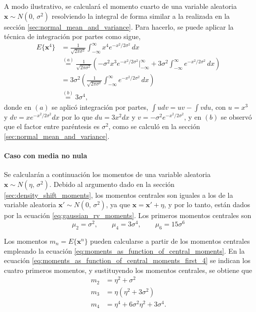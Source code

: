 \documentclass[a4paper]{report}
\newcommand{\x}{\mathbf{x}}
\begin{document}
A modo ilustrativo, se calculará el momento cuarto de una variable aleatoria \(\x\sim N(0,\,\sigma^2)\) resolviendo la integral de forma similar a la realizada en la sección \ref{sec:normal_mean_and_variance}. Para hacerlo, se puede aplicar la técnica de integración por partes como sigue,
\begin{align*}
 E\{\x^4\}&=\frac{1}{\sqrt{2\pi\sigma^2}}\int_{-\infty}^{\infty} x^4e^{-x^2/2\sigma^2}\,dx\\
 &\overset{(a)}{=}\frac{1}{\sqrt{2\pi\sigma^2}}\left(-\sigma^2x^3e^{-x^2/2\sigma^2}\bigg|_{-\infty}^{\infty} +3\sigma^2\int_{-\infty}^{\infty}e^{-x^2/2\sigma^2}\,dx\right)\\
 &=3\sigma^2\left(\frac{1}{\sqrt{2\pi\sigma^2}}\int_{-\infty}^{\infty}e^{-x^2/2\sigma^2}\,dx\right)\\
 &\overset{(b)}{=}3\sigma^4,
\end{align*}
donde en \((a)\) se aplicó integración por partes, \(\int udv=uv-\int vdu\), con \(u=x^3\) y \(dv=xe^{-x^2/2\sigma^2}dx\) por lo que \(du=3x^2dx\) y \(v=-\sigma^2e^{-x^2/2\sigma^2}\), y en \((b)\) se observó que el factor entre paréntesis es \(\sigma^2\), como se calculó en la sección \ref{sec:normal_mean_and_variance}.


\paragraph{Caso con media no nula} 

Se calcularán a continuación los momentos de una variable aleatoria \(\x\sim N(\eta,\,\sigma^2)\). Debido al argumento dado en la sección \ref{sec:density_shift_moments}, los momentos centrales son iguales a los de la variable aleatoria \(\x'\sim N(0,\,\sigma^2)\), ya que \(\x=\x'+\eta\), y por lo tanto, están dados por la ecuación \ref{eq:gaussian_rv_moments}. Los primeros momentos centrales son
\begin{equation}\label{eq:normal_rv_central_moments}
 \mu_2=\sigma^2,\qquad\mu_4=3\sigma^4,\qquad\mu_6=15\sigma^6
\end{equation}

Los momentos \(m_n=E\{\x^n\}\) pueden calcularse a partir de los momentos centrales empleando la ecuación \ref{eq:moments_as_function_of_central_moments}. En la ecuación \ref{eq:moments_as_function_of_central_moments_first_4} se indican los cuatro primeros momentos, y sustituyendo los momentos centrales, se obtiene que
\begin{equation}\label{eq:normal_rv_moments}
 \begin{aligned}
 m_2&=\eta^2+\sigma^2\\
 m_3&=\eta(\eta^2+3\sigma^2)\\
 m_4&=\eta^4+6\sigma^2\eta^2+3\sigma^4.
\end{aligned}
\end{equation}
\end{document}
